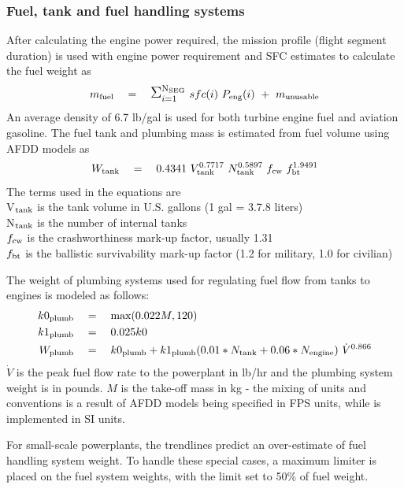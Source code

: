 \subsubsection{Fuel, tank and fuel handling systems}
After calculating the engine power required, the mission profile (flight segment duration) is used with engine power requirement and SFC estimates to calculate the fuel weight as 
\begin{equation}
m_{\rm fuel} \quad = \quad \mathlarger{\mathlarger{\Sigma}}_{i=1}^{\rm N_{\rm SEG}} \spc sfc(i) \spc P_{\rm eng}(i) \spc + \spc m_{\rm unusable}
\end{equation}
An average density of 6.7 lb/gal is used for both turbine engine fuel and aviation gasoline. The fuel tank and plumbing mass is estimated from fuel volume using AFDD models as 
\begin{equation}
   W_{\rm tank} \quad = \quad 0.4341 \textrm{ } V_{\rm tank}^{0.7717} \textrm{ } N_{\rm tank}^{0.5897}  \textrm{ } f_{\rm cw} \textrm{ }  f_{\rm bt}^{1.9491}
\end{equation}
The terms used in the equations are \\
V$_{\rm tank}$ is the tank volume in U.S. gallons (1 gal = 3.7.8 liters)\\
N$_{\rm tank}$ is the number of internal tanks \\
$f_{\rm cw}$ is the crashworthiness mark-up factor, usually 1.31 \\
$f_{\rm bt}$ is the ballistic survivability mark-up factor (1.2 for military, 1.0 for civilian) 

The weight of plumbing systems used for regulating fuel flow from tanks to engines is modeled as follows:
\begin{align*}
k0_{\rm plumb} \quad &= \quad \textrm{max}(0.022 M, 120) \\
k1_{\rm plumb} \quad &= \quad 0.025 k0 \\
W_{\rm plumb} \quad &= \quad k0_{\rm plumb} + k1_{\rm plumb} (0.01*N_{\rm tank} + 0.06*N_{\rm engine}) \textrm{ } \dot{V}^{0.866}
\end{align*}
$\dot{V}$ is the peak fuel flow rate to the powerplant in lb/hr and the plumbing system weight is in pounds. $M$ is the take-off mass in kg - the mixing of units and conventions is a result of AFDD models being specified in FPS units, while \hydra \spc is implemented in SI units. 

For small-scale powerplants, the trendlines predict an over-estimate of fuel handling system weight. To handle these special cases, a maximum limiter is placed on the fuel system weights, with the limit set to 50\% of fuel weight. 

